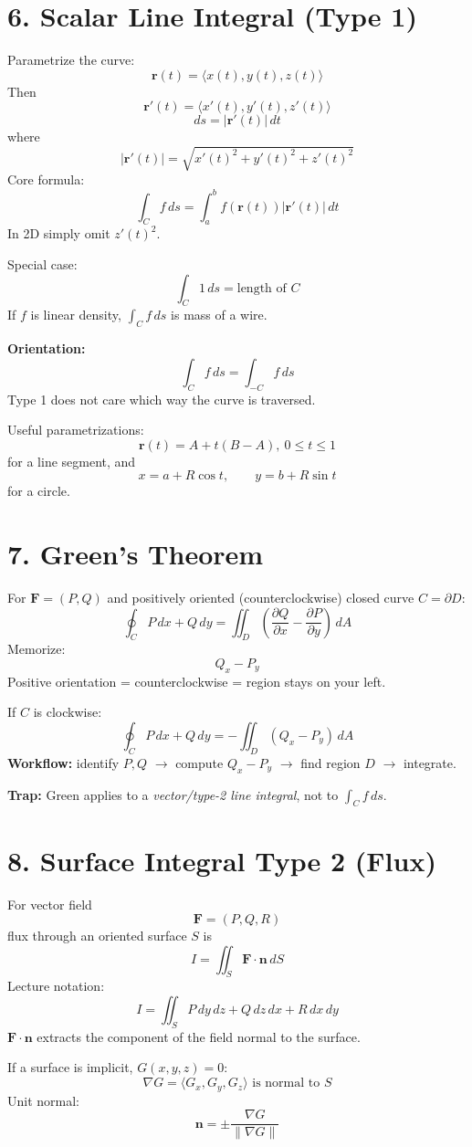\documentclass[10pt,a4paper]{article}
\newcommand{\boxeq}[1]{\[\boxed{#1}\]}
\begin{document}
\begin{multicols}{2}
\section*{6. Scalar Line Integral (Type 1)}
Parametrize the curve:
\boxeq{\mathbf r(t)=\langle x(t),y(t),z(t)\rangle}
Then
\boxeq{\mathbf r'(t)=\langle x'(t),y'(t),z'(t)\rangle}
\boxeq{ds=|\mathbf r'(t)|\,dt}
where
\boxeq{|\mathbf r'(t)|=\sqrt{x'(t)^2+y'(t)^2+z'(t)^2}}
Core formula:
\boxeq{\int_C f\,ds=\int_a^b f(\mathbf r(t))|\mathbf r'(t)|\,dt}
In 2D simply omit $z'(t)^2$.

Special case:
\boxeq{\int_C1\,ds=\text{length of }C}
If $f$ is linear density, $\int_C f\,ds$ is mass of a wire.

\textbf{Orientation:}
\boxeq{\int_C f\,ds=\int_{-C}f\,ds}
Type 1 does not care which way the curve is traversed.

Useful parametrizations:
\[
\mathbf r(t)=A+t(B-A),\ 0\le t\le1
\]
for a line segment, and
\[
x=a+R\cos t,\qquad y=b+R\sin t
\]
for a circle.

\section*{7. Green's Theorem}
For $\mathbf F=(P,Q)$ and positively oriented (counterclockwise) closed curve $C=\partial D$:
\boxeq{\oint_C P\,dx+Q\,dy=\iint_D\left(\frac{\partial Q}{\partial x}-\frac{\partial P}{\partial y}\right)\,dA}
Memorize:
\boxeq{Q_x-P_y}
Positive orientation = counterclockwise = region stays on your left.

If $C$ is clockwise:
\boxeq{\oint_C P\,dx+Q\,dy=-\iint_D(Q_x-P_y)\,dA}
\textbf{Workflow:} identify $P,Q$ $\to$ compute $Q_x-P_y$ $\to$ find region $D$ $\to$ integrate.

\textbf{Trap:} Green applies to a \emph{vector/type-2 line integral}, not to $\int_C f\,ds$.

\section*{8. Surface Integral Type 2 (Flux)}
For vector field
\boxeq{\mathbf F=(P,Q,R)}
flux through an oriented surface $S$ is
\boxeq{I=\iint_S\mathbf F\cdot\mathbf n\,dS}
Lecture notation:
\boxeq{I=\iint_S P\,dy\,dz+Q\,dz\,dx+R\,dx\,dy}
$\mathbf F\cdot\mathbf n$ extracts the component of the field normal to the surface.

If a surface is implicit, $G(x,y,z)=0$:
\boxeq{\nabla G=\langle G_x,G_y,G_z\rangle\text{ is normal to }S}
Unit normal:
\boxeq{\mathbf n=\pm\frac{\nabla G}{\|\nabla G\|}}


\end{multicols}
\end{document}
